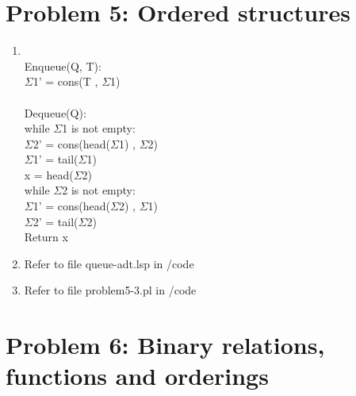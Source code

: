 \documentclass[12pt]{article}
\begin{document}
\section*{Problem 5: Ordered structures}
\begin{enumerate}
	\item 
	
	\begin{tabbing}
		\hspace{0.5pt}\=
		\\ %
		\>Enqueue(Q, T): \hspace{0.5pt}\=\\
		\>\> $\Sigma$1' = cons(T , $\Sigma$1) \\
		\\
		\>Dequeue(Q): \\
		\>\> while $\Sigma$1 is not empty:\hspace{0.5pt}\= \\
		\>\>\> $\Sigma$2' = cons(head($\Sigma$1) , $\Sigma$2) \\
		\>\>\> $\Sigma$1’ = tail($\Sigma$1) \\
		\>\> x = head($\Sigma$2) \\
		\>\> while $\Sigma$2 is not empty:\hspace{0.5pt}\= \\
		\>\>\> $\Sigma$1' = cons(head($\Sigma$2) , $\Sigma$1) \\
		\>\>\> $\Sigma$2’ = tail($\Sigma$2) \\
		\>\>Return x
	\end{tabbing}
	
	\item Refer to file queue-adt.lsp in /code
	\item Refer to file problem5-3.pl in /code
\end{enumerate}
\section*{Problem 6: Binary relations, functions and orderings}
\end{document}
